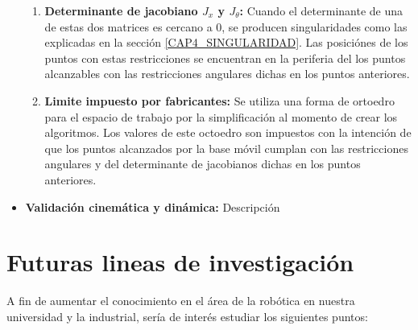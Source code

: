 \begin{itemize}
{\begin{enumerate}
                    \item{\textbf{Determinante de jacobiano $J_{x}$ y $J_{\theta}$: } Cuando el determinante de una de estas dos matrices es cercano a 0, se producen singularidades como las explicadas en la sección \eqref{CAP4_SINGULARIDAD}. Las posiciónes de los puntos con estas restricciones se encuentran en la periferia del los puntos alcanzables con las restricciones angulares dichas en los puntos anteriores.} 
                    \item{\textbf{Limite impuesto por fabricantes: } Se utiliza una forma de ortoedro para el espacio de trabajo por la simplificación al momento de crear los algoritmos. Los valores de este octoedro son impuestos con la intención de que los puntos alcanzados por la base móvil cumplan con las restricciones angulares y del determinante de jacobianos dichas en los puntos anteriores.  }
                \end{enumerate}  
            }
            \item {\textbf{Validación cinemática y dinámica:} Descripción}
        \end{itemize}


\newpage

\section{Futuras lineas de investigación}
A fin de aumentar el conocimiento en el área de la robótica en nuestra universidad y la industrial, sería de interés estudiar los siguientes puntos:

